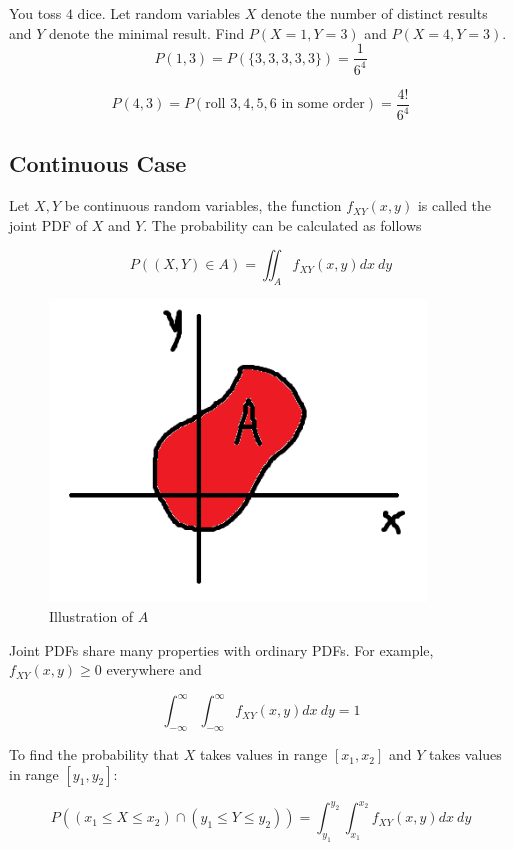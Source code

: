 \begin{texample}
	You toss $4$ dice. Let random variables $X$ denote the number of distinct results and $Y$ denote the minimal result. Find $P(X=1,Y=3)$ and $P(X=4,Y=3)$. \\
	
	$$P(1,3)=P(\{3, 3, 3, 3, 3\})=\frac{1}{6^4}$$
	
	$$P(4, 3)=P(\text{roll $3,4,5,6$ in some order})=\frac{4!}{6^4}$$
\end{texample}

\subsection{Continuous Case}

Let $X,Y$ be continuous random variables, the function $f_{XY}(x,y)$ is called the joint PDF of $X$ and $Y$. The probability can be calculated as follows

\[ P((X,Y)\in A) = \iint_A f_{XY}(x,y) dx \:dy \]

\begin{figure}[H]
	\centering
	\includegraphics[width=100mm]{21.png}
	\caption{Illustration of $A$}
\end{figure}

Joint PDFs share many properties with ordinary PDFs. For example, $f_{XY}(x,y)\ge0$ everywhere and

\[ \int_{-\infty}^\infty \int_{-\infty}^\infty f_{XY}(x,y) dx \:dy = 1 \]

To find the probability that $X$ takes values in range $[x_1, x_2]$ and $Y$ takes values in range $[y_1, y_2]$:

\[ P((x_1\le X\le x_2) \cap (y_1\le Y\le y_2)) = \int_{y_1}^{y_2} \int_{x_1}^{x_2} f_{XY}(x,y) dx \:dy \]

